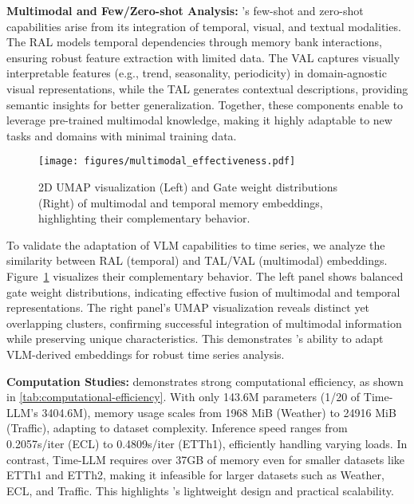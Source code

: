 \noindent\textbf{Multimodal and Few/Zero-shot Analysis:} \method's few-shot and zero-shot capabilities arise from its integration of temporal, visual, and textual modalities. The RAL models temporal dependencies through memory bank interactions, ensuring robust feature extraction with limited data. The VAL captures visually interpretable features (e.g., trend, seasonality, periodicity) in domain-agnostic visual representations, while the TAL generates contextual descriptions, providing semantic insights for better generalization. Together, these components enable \method to leverage pre-trained multimodal knowledge, making it highly adaptable to new tasks and domains with minimal training data.

\vspace{-0.5em}
\begin{figure}[h!]
    \centering
    \texttt{[image: figures/multimodal\_effectiveness.pdf]}
    \caption{2D UMAP visualization (Left) and Gate weight distributions (Right) of multimodal and temporal memory embeddings, highlighting their complementary behavior.}
    \label{fig:fusion_analysis}
\end{figure}
\vspace{-0.5em}

To validate the adaptation of VLM capabilities to time series, we analyze the similarity between RAL (temporal) and TAL/VAL (multimodal) embeddings. Figure~\ref{fig:fusion_analysis} visualizes their complementary behavior. The left panel shows balanced gate weight distributions, indicating effective fusion of multimodal and temporal representations. The right panel's UMAP visualization reveals distinct yet overlapping clusters, confirming successful integration of multimodal information while preserving unique characteristics. This demonstrates \method's ability to adapt VLM-derived embeddings for robust  time series analysis.

\textbf{Computation Studies:} \method demonstrates strong computational efficiency, as shown in \autoref{tab:computational-efficiency}. With only 143.6M parameters (1/20 of Time-LLM's 3404.6M), memory usage scales from 1968 MiB (Weather) to 24916 MiB (Traffic), adapting to dataset complexity. Inference speed ranges from 0.2057s/iter (ECL) to 0.4809s/iter (ETTh1), efficiently handling varying loads. In contrast, Time-LLM requires over 37GB of memory even for smaller datasets like ETTh1 and ETTh2, making it infeasible for larger datasets such as Weather, ECL, and Traffic. This highlights \method's lightweight design and practical scalability.

